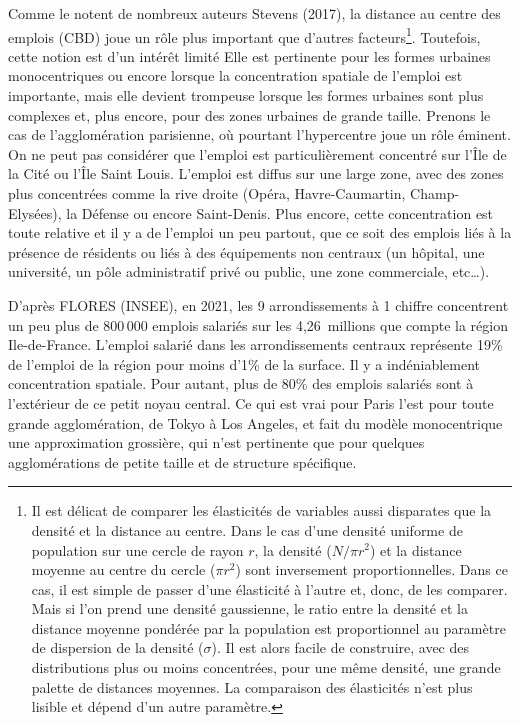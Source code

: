 \documentclass[
  9pt,
  a4paper,
  DIV=11]{scrreprt}
\begin{document}
Comme le notent de nombreux auteurs Stevens (2017), la distance au
centre des emplois (CBD) joue un rôle plus important que d'autres
facteurs\footnote{Il est délicat de comparer les élasticités de
  variables aussi disparates que la densité et la distance au centre.
  Dans le cas d'une densité uniforme de population sur une cercle de
  rayon \(r\), la densité (\(N/{\pi r^2}\)) et la distance moyenne au
  centre du cercle (\(\pi r^2\)) sont inversement proportionnelles. Dans
  ce cas, il est simple de passer d'une élasticité à l'autre et, donc,
  de les comparer. Mais si l'on prend une densité gaussienne, le ratio
  entre la densité et la distance moyenne pondérée par la population est
  proportionnel au paramètre de dispersion de la densité (\(\sigma\)).
  Il est alors facile de construire, avec des distributions plus ou
  moins concentrées, pour une même densité, une grande palette de
  distances moyennes. La comparaison des élasticités n'est plus lisible
  et dépend d'un autre paramètre.}. Toutefois, cette notion est d'un
intérêt limité Elle est pertinente pour les formes urbaines
monocentriques ou encore lorsque la concentration spatiale de l'emploi
est importante, mais elle devient trompeuse lorsque les formes urbaines
sont plus complexes et, plus encore, pour des zones urbaines de grande
taille. Prenons le cas de l'agglomération parisienne, où pourtant
l'hypercentre joue un rôle éminent. On ne peut pas considérer que
l'emploi est particulièrement concentré sur l'Île de la Cité ou l'Île
Saint Louis. L'emploi est diffus sur une large zone, avec des zones plus
concentrées comme la rive droite (Opéra, Havre-Caumartin,
Champ-Elysées), la Défense ou encore Saint-Denis. Plus encore, cette
concentration est toute relative et il y a de l'emploi un peu partout,
que ce soit des emplois liés à la présence de résidents ou liés à des
équipements non centraux (un hôpital, une université, un pôle
administratif privé ou public, une zone commerciale, etc\ldots).

D'après FLORES (INSEE), en 2021, les 9 arrondissements à 1 chiffre
concentrent un peu plus de 800\,000 emplois salariés sur les
4,26~millions que compte la région Ile-de-France. L'emploi salarié dans
les arrondissements centraux représente 19\% de l'emploi de la région
pour moins d'1\% de la surface. Il y a indéniablement concentration
spatiale. Pour autant, plus de 80\% des emplois salariés sont à
l'extérieur de ce petit noyau central. Ce qui est vrai pour Paris l'est
pour toute grande agglomération, de Tokyo à Los Angeles, et fait du
modèle monocentrique une approximation grossière, qui n'est pertinente
que pour quelques agglomérations de petite taille et de structure
spécifique.
\end{document}
